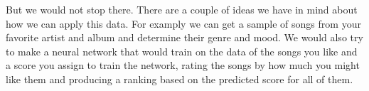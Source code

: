 \documentclass[12pt, oneside, a4paper]{article}
\begin{document}
    But we would not stop there. There are a couple of ideas we have in mind about how we can apply this data. For examply we can get a sample of songs from your favorite artist and album and determine their genre and mood. We would also try to make a neural network that would train on the data of the songs you like and a score you assign to train the network, rating the songs by how much you might like them and producing a ranking based on the predicted score for all of them. 
\end{document}
